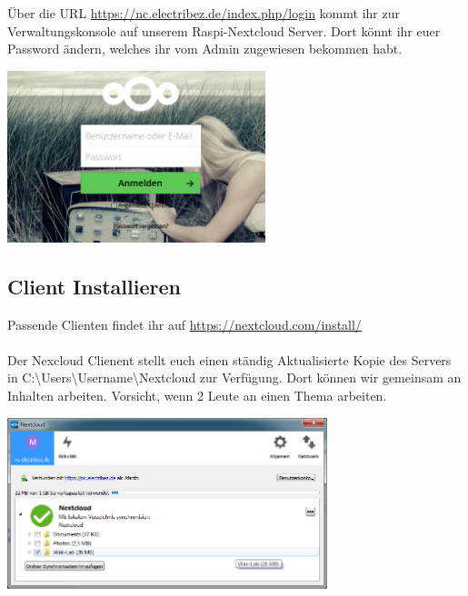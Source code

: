Über die URL \url{https://nc.electribez.de/index.php/login} kommt ihr zur Verwaltungskonsole auf unserem Raspi-Nextcloud Server. Dort könnt ihr euer Password ändern, welches ihr vom Admin zugewiesen bekommen habt.\\

\begin{minipage}[t]{\textwidth}
  \centering
  \includegraphics[height=5cm]{pictures/Nextcloudlogin.png}
  \label{img:Nextcloudlogin}
\end{minipage}


\subsection{Client Installieren}
Passende Clienten findet ihr auf \url{https://nextcloud.com/install/}\\
\ \\
Der Nexcloud Clienent stellt euch einen ständig Aktualisierte Kopie des Servers in C:\textbackslash Users\textbackslash Username\textbackslash Nextcloud zur Verfügung. Dort können wir gemeinsam an Inhalten arbeiten. Vorsicht, wenn 2 Leute an einen Thema arbeiten.\\
 
\begin{minipage}[t]{\textwidth}
  \centering
  \includegraphics[height=5cm]{pictures/NextcloudWinClient.png}
  \label{img:NextcloudWinClient}
\end{minipage}





